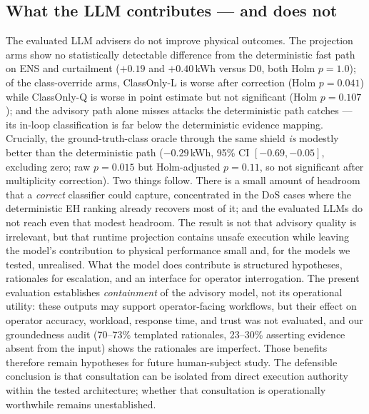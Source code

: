 \subsection{What the LLM contributes --- and does not}
\label{sec:disc-llm}
The evaluated LLM advisers do not improve physical outcomes. The projection arms
show no statistically detectable difference from the deterministic fast path on
ENS and curtailment ($+0.19$ and $+0.40$\,kWh versus D0, both Holm $p=1.0$); of
the class-override arms, ClassOnly-L is worse after correction (Holm $p=0.041$)
while ClassOnly-Q is worse in point estimate but not significant (Holm
$p=0.107$); and the advisory path alone misses attacks the deterministic path
catches --- its in-loop classification is far below the deterministic evidence
mapping.
Crucially, the ground-truth-class oracle through the same shield \emph{is}
modestly better than the deterministic path ($-0.29$\,kWh, 95\% CI
$[-0.69, -0.05]$, excluding zero; raw $p=0.015$ but Holm-adjusted
$p=0.11$, so not significant after multiplicity correction). Two things
follow. There is a small amount of headroom that a \emph{correct}
classifier could capture, concentrated in the DoS cases where the
deterministic EH ranking already recovers most of it; and the evaluated
LLMs do not reach even that modest headroom. The result is not that
advisory quality is irrelevant, but that runtime projection contains
unsafe execution while leaving the model's contribution to physical
performance small and, for the models we tested, unrealised. What the model does
contribute is structured hypotheses, rationales for escalation, and an interface
for operator interrogation. The present evaluation establishes \emph{containment}
of the advisory model, not its operational utility: these outputs may support
operator-facing workflows, but their effect on operator accuracy, workload,
response time, and trust was not evaluated, and our groundedness audit
(70--73\% templated rationales, 23--30\% asserting evidence absent from the
input) shows the rationales are imperfect. Those benefits therefore remain
hypotheses for future human-subject study. The defensible conclusion is that
consultation can be isolated from direct execution authority within the tested
architecture; whether that consultation is operationally worthwhile remains
unestablished.

